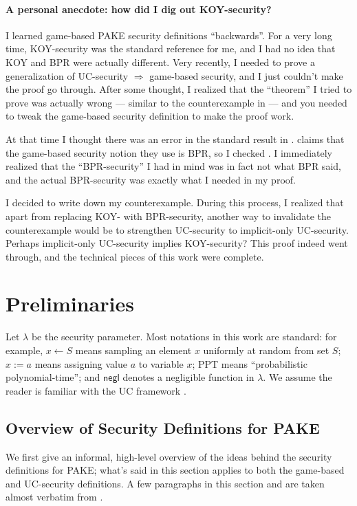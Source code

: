 \documentclass{article}
\newcommand{\negl}{\mathsf{negl}}
\begin{document}
\paragraph{A personal anecdote: how did I dig out KOY-security?}
I learned game-based PAKE security definitions ``backwards''. For a very long time, KOY-security was the standard reference for me, and I had no idea that KOY and BPR were actually different. Very recently, I needed to prove a generalization of UC-security $\Rightarrow$ game-based security, and I just couldn't make the proof go through. After some thought, I realized that the ``theorem'' I tried to prove was actually wrong --- similar to the counterexample in  --- and you needed to tweak the game-based security definition to make the proof work.

At that time I thought there was an error in the standard result in \cite{EC:CHKLM05}. \cite{EC:CHKLM05} claims that the game-based security notion they use is BPR, so I checked \cite{EC:BelPoiRog00}. I immediately realized that the ``BPR-security'' I had in mind was in fact not what BPR said, and the actual BPR-security was exactly what I needed in my proof.

I decided to write down my counterexample. During this process, I realized that apart from replacing KOY- with BPR-security, another way to invalidate the counterexample would be to strengthen UC-security to implicit-only UC-security. Perhaps implicit-only UC-security implies KOY-security? This proof indeed went through, and the technical pieces of this work were complete.

\section{Preliminaries}
\label{sec:prelims}
Let $\lambda$ be the security parameter. Most notations in this work are standard: for example, $x \gets S$ means sampling an element $x$ uniformly at random from set $S$; $x := a$ means assigning value $a$ to variable $x$; PPT means ``probabilistic polynomial-time''; and $\negl$ denotes a negligible function in $\lambda$. We assume the reader is familiar with the UC framework \cite{FOCS:Canetti01}.
\subsection{Overview of Security Definitions for PAKE}
\label{sec:principles}
We first give an informal, high-level overview of the ideas behind the security definitions for PAKE; what's said in this section applies to both the game-based and UC-security definitions. A few paragraphs in this section and  are taken almost verbatim from \cite{EPRINT:Xu25}.
\end{document}
